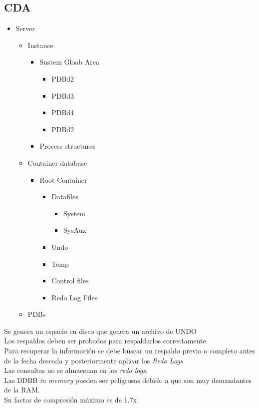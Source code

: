 \subsection{CDA}
\begin{itemize}
	\item Server
	\begin{itemize}
		\item Instance
			\begin{itemize}
				\item Sustem Gloab Area
				\begin{itemize}
					\item PDBd2
					\item PDBd3
					\item PDBd4
					\item PDBd2
				\end{itemize}
				\item Process structures
			\end{itemize}
		\item Container database
			\begin{itemize}
				\item Root Container
				\begin{itemize}
					\item Datafiles
					\begin{itemize}
						\item System
						\item SysAux
					\end{itemize}
					\item Undo
					\item Temp
					\item Control files
					\item Redo Log Files
				\end{itemize}
			\end{itemize}
		\item PDBs
	\end{itemize}
\end{itemize}
Se genera un espacio en disco que genera un archivo de UNDO\\
Los respaldos deben ser probados para respaldarlos correctamente.\\
Para recuperar la informaci\'{o}n se debe buscar un respaldo previo o completo antes de la fecha deseada y posteriormente aplicar los \textit{Redo Logs}\\
Las consultas no se almacenan en los \textit{redo logs}.\\
Las DDBB \textit{in memory} pueden ser peligrosas debido a que son muy demandantes de la RAM.\\
Su factor de compresi\'{o}n m\'{a}ximo es de 1.7x\\

